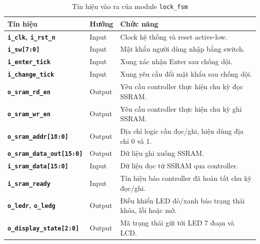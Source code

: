 \documentclass[13pt,a4paper]{article}
\begin{document}
\begin{table}[H]
\centering
\caption{Tín hiệu vào ra của module \texttt{lock\_fsm}}
\label{tab:io_lock_fsm}
\scriptsize
\begin{tabularx}{\textwidth}{|>{\bfseries}p{4.7cm}|p{1.5cm}|X|}
\hline
\textbf{Tín hiệu} & \textbf{Hướng} & \textbf{Chức năng}\\
\hline
\texttt{i\_clk}, \texttt{i\_rst\_n} & Input & Clock hệ thống và reset active-low.\\
\hline
\texttt{i\_sw[7:0]} & Input & Mật khẩu người dùng nhập bằng switch.\\
\hline
\texttt{i\_enter\_tick} & Input & Xung xác nhận Enter sau chống dội.\\
\hline
\texttt{i\_change\_tick} & Input & Xung yêu cầu đổi mật khẩu sau chống dội.\\
\hline
\texttt{o\_sram\_rd\_en} & Output & Yêu cầu controller thực hiện chu kỳ đọc SSRAM.\\
\hline
\texttt{o\_sram\_wr\_en} & Output & Yêu cầu controller thực hiện chu kỳ ghi SSRAM.\\
\hline
\texttt{o\_sram\_addr[18:0]} & Output & Địa chỉ logic cần đọc/ghi, hiện dùng địa chỉ 0 và 1.\\
\hline
\texttt{o\_sram\_data\_out[15:0]} & Output & Dữ liệu ghi xuống SSRAM.\\
\hline
\texttt{i\_sram\_data[15:0]} & Input & Dữ liệu đọc từ SSRAM qua controller.\\
\hline
\texttt{i\_sram\_ready} & Input & Tín hiệu báo controller đã hoàn tất chu kỳ đọc/ghi.\\
\hline
\texttt{o\_ledr}, \texttt{o\_ledg} & Output & Điều khiển LED đỏ/xanh báo trạng thái khóa, lỗi hoặc mở.\\
\hline
\texttt{o\_display\_state[2:0]} & Output & Mã trạng thái gửi tới LED 7 đoạn và LCD.\\
\hline
\end{tabularx}
\end{table}
\normalsize
\end{document}
